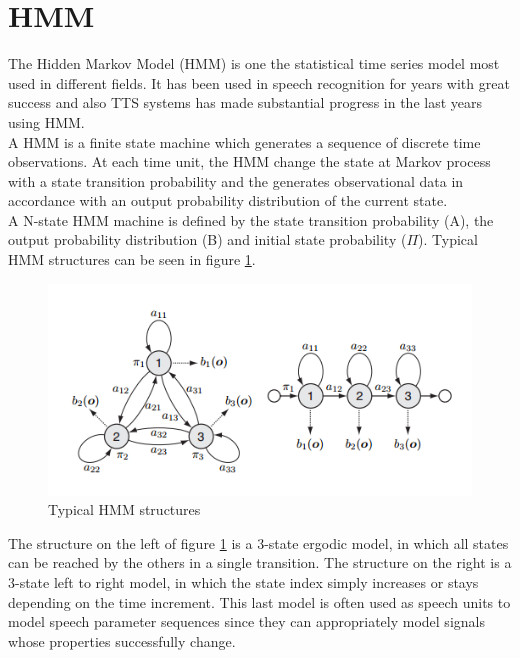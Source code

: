 \section{HMM}\label{hmm}
The Hidden Markov Model (HMM) is one the statistical time series model most used in different fields. It has been used in speech recognition for years with great success and also TTS systems has made substantial progress in the last years using HMM.\\
A HMM is a finite state machine which generates a sequence of discrete time observations. At each time unit, the HMM change the state at Markov process with a state transition probability and the generates observational data in accordance with an output probability distribution of the current state.\\
A N-state HMM machine is defined by the state transition probability (A), the output probability distribution (B) and initial state probability ($\Pi$). Typical HMM structures can be seen in figure \ref{hmmstruct}.\\
\begin{figure}[htb]
	\begin{center}
	\includegraphics[width=1\textwidth]{img/hmmstruct.png}
	\end{center}
	\caption{\label{hmmstruct}Typical HMM structures \cite{introhmmbased}}
\end{figure}
The structure on the left of figure \ref{hmmstruct} is a 3-state ergodic model, in which all states can be reached by the others in a single transition. The structure on the right is a 3-state left to right model, in which the state index simply increases or stays depending on the time increment. This last model is often used as speech units to model speech parameter sequences since they can appropriately model signals whose properties successfully change.\\
\clearpage%
